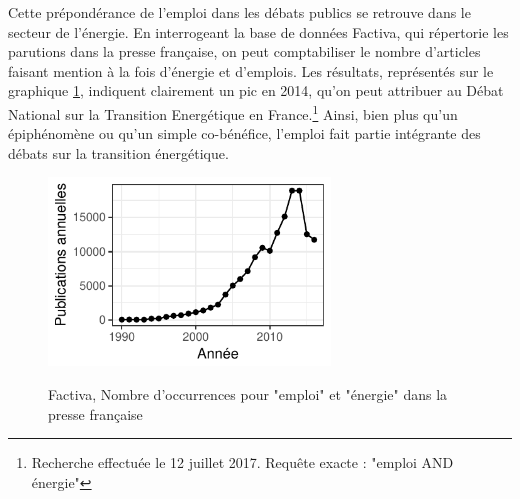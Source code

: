 Cette prépondérance de l'emploi dans les débats publics se retrouve dans le secteur de l'énergie. 
En interrogeant la base de données Factiva, qui répertorie les parutions dans la presse française, on peut comptabiliser le nombre d'articles faisant mention à la fois d'énergie et d'emplois. 
Les résultats, représentés sur le graphique \ref{fig:Factiva}, indiquent clairement un pic en 2014, qu'on peut attribuer au Débat National sur la Transition Energétique en France.\footnote{Recherche effectuée le 12 juillet 2017. Requête exacte : "emploi AND énergie"} 
Ainsi, bien plus qu’un épiphénomène ou qu’un simple co-bénéfice, l’emploi fait partie intégrante des débats sur la transition énergétique. 

\begin{figure}[h!]
	\centering
	\caption{Factiva, Nombre d'occurrences pour "emploi" et "énergie" dans la presse française}
	\includegraphics[height=5cm]{figures/Factiva.pdf}
	\label{fig:Factiva}
\end{figure}

